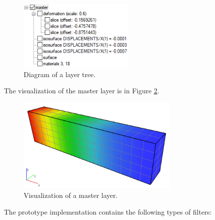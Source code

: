 \begin{figure}[H]
    \centering
    \includegraphics[width=0.5\textwidth]{figures/chapter-data-management/layers-tree-diagram}
    \decoRule
    \caption{Diagram of a layer tree.}
    \label{fig:layers-tree}
\end{figure}

The visualization of the master layer is in Figure \ref{fig:beam-master-layer}.

\begin{figure}[H]
    \centering
    \includegraphics[width=0.7\textwidth]{figures/chapter-data-management/beam-master-layer}
    \decoRule
    \caption{Visualization of a master layer.}
    \label{fig:beam-master-layer}
\end{figure}

The prototype implementation contains the following types of filters:


